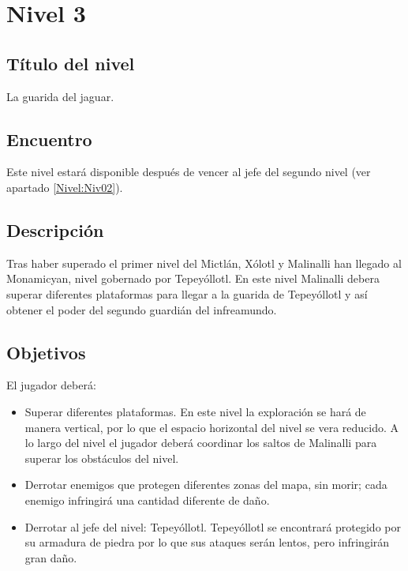 \section{Nivel 3}\label{Nivel:Niv03}
	\subsection{Título del nivel}
	La guarida del jaguar.	
	\subsection{Encuentro}
Este nivel estará disponible después de vencer al jefe del segundo nivel (ver apartado \ref{Nivel:Niv02}).
	\subsection{Descripción}
	Tras haber superado el primer nivel del Mictlán, Xólotl y Malinalli han llegado al Monamicyan, nivel gobernado por Tepeyóllotl. En este nivel Malinalli debera superar diferentes plataformas para llegar a la guarida de Tepeyóllotl y así obtener el poder del segundo guardián del infreamundo.
	\subsection{Objetivos}
	El jugador deberá:
\begin{itemize}
	\item Superar diferentes plataformas. En este nivel la exploración se hará de manera vertical, por lo que el espacio horizontal del nivel se vera reducido. A lo largo del nivel el jugador deberá coordinar los saltos de Malinalli para superar los obstáculos del nivel.
	\item Derrotar enemigos que protegen diferentes zonas del mapa, sin morir; cada enemigo infringirá una cantidad diferente de daño.
	\item Derrotar al jefe del nivel: Tepeyóllotl. Tepeyóllotl se encontrará protegido por su armadura de piedra por lo que sus ataques serán lentos, pero infringirán gran daño.
\end{itemize}
